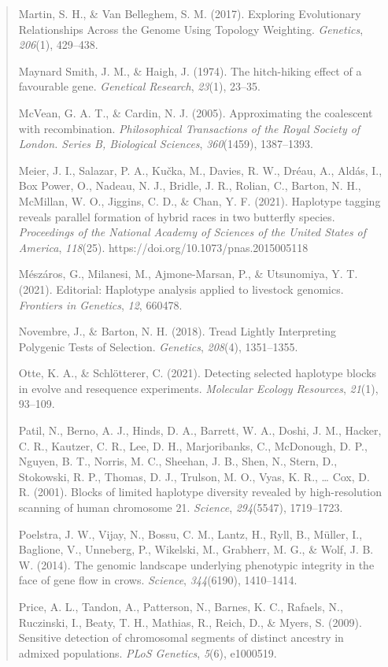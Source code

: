 \documentclass[
]{article}
\begin{document}
\begin{quote}
Martin, S. H., \& Van Belleghem, S. M. (2017). Exploring Evolutionary
Relationships Across the Genome Using Topology Weighting.
\emph{Genetics}, \emph{206}(1), 429--438.

Maynard Smith, J. M., \& Haigh, J. (1974). The hitch-hiking effect of a
favourable gene. \emph{Genetical Research}, \emph{23}(1), 23--35.

McVean, G. A. T., \& Cardin, N. J. (2005). Approximating the coalescent
with recombination. \emph{Philosophical Transactions of the Royal
Society of London. Series B, Biological Sciences}, \emph{360}(1459),
1387--1393.

Meier, J. I., Salazar, P. A., Kučka, M., Davies, R. W., Dréau, A.,
Aldás, I., Box Power, O., Nadeau, N. J., Bridle, J. R., Rolian, C.,
Barton, N. H., McMillan, W. O., Jiggins, C. D., \& Chan, Y. F. (2021).
Haplotype tagging reveals parallel formation of hybrid races in two
butterfly species. \emph{Proceedings of the National Academy of Sciences
of the United States of America}, \emph{118}(25).
https://doi.org/10.1073/pnas.2015005118

Mészáros, G., Milanesi, M., Ajmone-Marsan, P., \& Utsunomiya, Y. T.
(2021). Editorial: Haplotype analysis applied to livestock genomics.
\emph{Frontiers in Genetics}, \emph{12}, 660478.

Novembre, J., \& Barton, N. H. (2018). Tread Lightly Interpreting
Polygenic Tests of Selection. \emph{Genetics}, \emph{208}(4),
1351--1355.

Otte, K. A., \& Schlötterer, C. (2021). Detecting selected haplotype
blocks in evolve and resequence experiments. \emph{Molecular Ecology
Resources}, \emph{21}(1), 93--109.

Patil, N., Berno, A. J., Hinds, D. A., Barrett, W. A., Doshi, J. M.,
Hacker, C. R., Kautzer, C. R., Lee, D. H., Marjoribanks, C., McDonough,
D. P., Nguyen, B. T., Norris, M. C., Sheehan, J. B., Shen, N., Stern,
D., Stokowski, R. P., Thomas, D. J., Trulson, M. O., Vyas, K. R.,
\ldots{} Cox, D. R. (2001). Blocks of limited haplotype diversity
revealed by high-resolution scanning of human chromosome 21.
\emph{Science}, \emph{294}(5547), 1719--1723.

Poelstra, J. W., Vijay, N., Bossu, C. M., Lantz, H., Ryll, B., Müller,
I., Baglione, V., Unneberg, P., Wikelski, M., Grabherr, M. G., \& Wolf,
J. B. W. (2014). The genomic landscape underlying phenotypic integrity
in the face of gene flow in crows. \emph{Science}, \emph{344}(6190),
1410--1414.

Price, A. L., Tandon, A., Patterson, N., Barnes, K. C., Rafaels, N.,
Ruczinski, I., Beaty, T. H., Mathias, R., Reich, D., \& Myers, S.
(2009). Sensitive detection of chromosomal segments of distinct ancestry
in admixed populations. \emph{PLoS Genetics}, \emph{5}(6), e1000519.


\end{quote}
\end{document}
